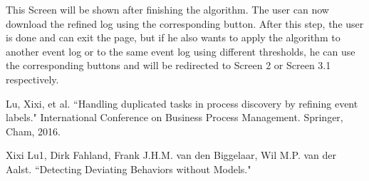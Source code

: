 \documentclass[notitlepage]{article}
\begin{document}
\begin{flushleft}
This Screen will be shown after finishing the algorithm. The user can now download the refined log using the corresponding button. After this step, the user is done and can exit the page, but if he also wants to apply the algorithm to another event log or to the same event log using different thresholds, he can use the corresponding buttons and will be redirected to Screen 2 or Screen 3.1 respectively.


%
%  




\end{flushleft}
%



\begin{thebibliography}{5}
Lu, Xixi, et al. ``Handling duplicated tasks in process discovery by refining event labels." International Conference on Business Process Management. Springer, Cham, 2016.

Xixi Lu1, Dirk Fahland, Frank J.H.M. van den Biggelaar, Wil M.P. van der Aalst. ``Detecting Deviating Behaviors without Models."


\end{thebibliography}
\end{document}

